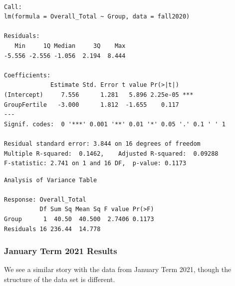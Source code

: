 \documentclass[12pt,twoside]{reedthesis}
\begin{document}
\begin{verbatim}

Call:
lm(formula = Overall_Total ~ Group, data = fall2020)

Residuals:
   Min     1Q Median     3Q    Max 
-5.556 -2.556 -1.056  2.194  8.444 

Coefficients:
             Estimate Std. Error t value Pr(>|t|)    
(Intercept)     7.556      1.281   5.896 2.25e-05 ***
GroupFertile   -3.000      1.812  -1.655    0.117    
---
Signif. codes:  0 '***' 0.001 '**' 0.01 '*' 0.05 '.' 0.1 ' ' 1

Residual standard error: 3.844 on 16 degrees of freedom
Multiple R-squared:  0.1462,    Adjusted R-squared:  0.09288 
F-statistic: 2.741 on 1 and 16 DF,  p-value: 0.1173
\end{verbatim}
\begin{verbatim}
Analysis of Variance Table

Response: Overall_Total
          Df Sum Sq Mean Sq F value Pr(>F)
Group      1  40.50  40.500  2.7406 0.1173
Residuals 16 236.44  14.778               
\end{verbatim}
\hypertarget{january-term-2021-results}{%
\subsubsection{January Term 2021 Results}\label{january-term-2021-results}}

We see a similar story with the data from January Term 2021, though the structure of the data set is different.
\end{document}
